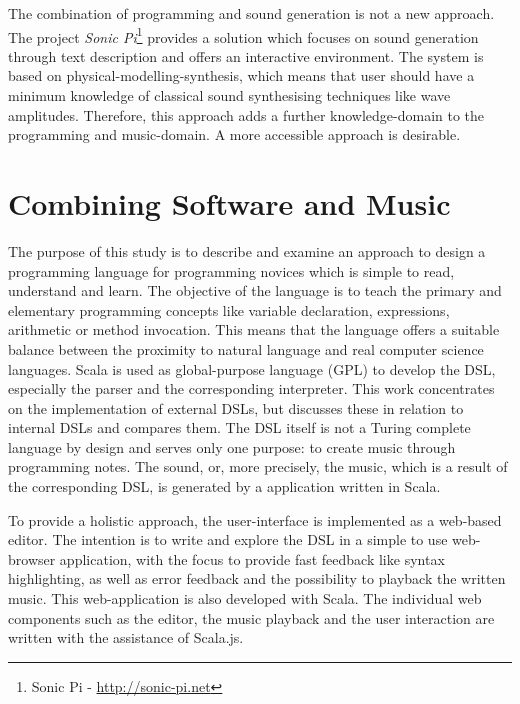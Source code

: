 The combination of programming and sound generation is not a new approach. The project \textit{Sonic Pi}\footnote{Sonic Pi - \url{http://sonic-pi.net}} provides a solution which focuses on sound generation through text description and offers an interactive environment.\cite{Aaron2013} The system is based on physical-modelling-synthesis, which means that user should have a minimum knowledge of classical sound synthesising techniques like wave amplitudes. Therefore, this approach adds a further knowledge-domain to the programming and music-domain. A more accessible approach is desirable.

\section{Combining Software and Music}
\label{INTRO_SOFT}
The purpose of this study is to describe and examine an approach to design a programming language for programming novices which is simple to read, understand and learn. The objective of the language is to teach the primary and elementary programming concepts like variable declaration, expressions, arithmetic or method invocation. This means that the language offers a suitable balance between the proximity to natural language and real computer science languages. Scala is used as global-purpose language (GPL) to develop the DSL, especially the parser and the corresponding interpreter. This work concentrates on the implementation of external DSLs, but discusses these in relation to internal DSLs and compares them. The DSL itself is not a Turing complete language by design and serves only one purpose: to create music through programming notes. The sound, or, more precisely, the music, which is a result of the corresponding DSL, is generated by a application written in Scala.

To provide a holistic approach, the user-interface is implemented as a web-based editor. The intention is to write and explore the DSL in a simple to use web-browser application, with the focus to provide fast feedback like syntax highlighting, as well as error feedback and the possibility to playback the written music. This web-application is also developed with Scala. The individual web components such as the editor, the music playback and the user interaction are written with the assistance of Scala.js.

